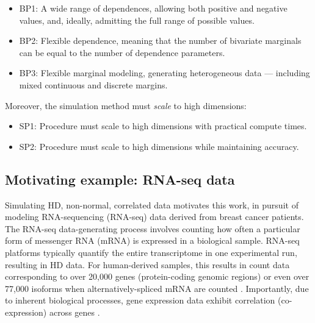 \documentclass[
]{jss}
\providecommand{\tightlist}{%
  \setlength{\itemsep}{0pt}\setlength{\parskip}{0pt}}
\begin{document}

\begin{itemize}
\tightlist
\item
  BP1: A wide range of dependences, allowing both positive and negative
  values, and, ideally, admitting the full range of possible values.
\item
  BP2: Flexible dependence, meaning that the number of bivariate
  marginals can be equal to the number of dependence parameters.
\item
  BP3: Flexible marginal modeling, generating heterogeneous data ---
  including mixed continuous and discrete margins.
\end{itemize}


Moreover, the simulation method must \emph{scale} to high dimensions:


\begin{itemize}
\tightlist
\item
  SP1: Procedure must scale to high dimensions with practical compute
  times.
\item
  SP2: Procedure must scale to high dimensions while maintaining
  accuracy.
\end{itemize}


\hypertarget{motivating-example-rna-seq-data}{%
\subsection{Motivating example: RNA-seq
data}\label{motivating-example-rna-seq-data}}

Simulating HD, non-normal, correlated data motivates this work, in
pursuit of modeling RNA-sequencing (RNA-seq) data
\citep{Wang2009b, Conesa2016b} derived from breast cancer patients. The
RNA-seq data-generating process involves counting how often a particular
form of messenger RNA (mRNA) is expressed in a biological sample.
RNA-seq platforms typically quantify the entire transcriptome in one
experimental run, resulting in HD data. For human-derived samples, this
results in count data corresponding to over 20,000 genes (protein-coding
genomic regions) or even over 77,000 isoforms when alternatively-spliced
mRNA are counted \citep{Schissler2019}. Importantly, due to inherent
biological processes, gene expression data exhibit correlation
(co-expression) across genes \citep{BE07, Schissler2018}.
\end{document}
